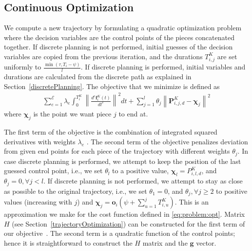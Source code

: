 \documentclass{svproc}
\newcommand{\vP}{\mathbf{P}}
\newcommand{\vg}{\mathbf{g}}
\newcommand{\vf}{\mathbf{f}}
\newcommand{\vo}{\mathbf{o}}
\newcommand{\vchi}{\mathbf{\chi}}
\newcommand{\cE}{\mathcal{E}}
\begin{document}

\subsection{Continuous Optimization}\label{continuousOptimization}
We compute a new trajectory by formulating a quadratic optimization problem where the decision variables are the control points of the pieces concatenated together.
If discrete planning is not performed, initial guesses of the decision variables are copied from the previous iteration, and the durations $T^{K}_{i,j}$ are set uniformly to $\frac{\min(\tau,T_i-\psi)}{l}$.
If discrete planning is performed, initial variables and durations are calculated from the discrete path as explained in Section~\ref{discretePlanning}.
The objective that we minimize is defined as
\begin{align}
    \sum_{e=1}^{\cE} \lambda_e\int_{0}^{T^K_i} \left\|\frac{d^e\vf^{K}_i(t)}{dt^e}\right\|^2dt + \sum_{j=1}^{l} \theta_j \left\|\vP^{K}_{i,j,d} - \vchi_{j}\right\|^2 \label{costFunction}
\end{align}
where $\vchi_j$ is the point we want piece $j$ to end at.

The first term of the objective is the combination of integrated squared derivatives with weights $\lambda_e$ \cite{crazyplanning-ieeetro,richterISRR}.
The second term of the objective penalizes deviation from given end points for each piece of the trajectory with different weights $\theta_j$.
In case discrete planning is performed, we attempt to keep the position of the last guessed control point, i.e., we set $\theta_l$ to a positive value,  $\vchi_l = P^K_{i,l,d}$, and $\theta_j = 0, \forall j < l$.
If discrete planning is not performed, we attempt to stay as close as possible to the original trajectory, i.e.,  we set $\theta_1 = 0$, and $\theta_j, \forall j \geq 2$ to positive values (increasing with $j$) and $\vchi_j = \vo_i(\psi + \sum_{u=1}^j T^{K}_{i,u})$.
This is an approximation we make for the cost function defined in \eqref{eq:problem:opt}.
Matrix $H$ (see Section~\ref{trajectoryOptimization}) can be constructed for the first term of our objective~\cite{crazyplanning-ieeetro}.
The second term is a quadratic function of the control points; hence it is straightforward to construct the $H$ matrix and the $\vg$ vector.
\end{document}

